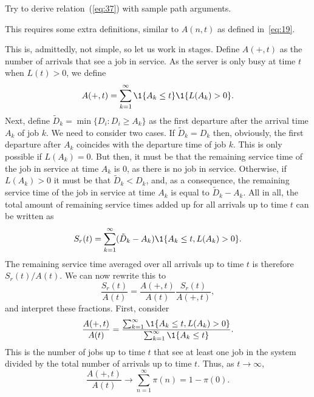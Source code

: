 \begin{exercise}
  Try to derive relation~(\ref{eq:37}) with sample path
  arguments. 
  \begin{hint}
This requires some extra definitions, similar to
  $A(n,t)$ as defined in~\eqref{eq:19}.
  \end{hint}
  \begin{solution}
    This is, admittedly, not simple, so let us work in stages. Define
    $A(+,t)$ as the number of arrivals that see a job in service. As
    the server is only busy at time $t$ when $L(t)>0$, we define
    \begin{equation*}
      A(+,t) = \sum_{k=1}^\infty \1{A_k\leq t}\1{L(A_k) > 0}.
    \end{equation*}
    Next, define $\tilde D_k = \min\{D_i: D_i \geq A_k\}$ as the first
    departure after the arrival time $A_k$ of job $k$. We need to
    consider two cases. If $\tilde D_k = D_k$ then, obviously, the
    first departure after $A_k$ coincides with the departure time of
    job $k$. This is only possible if $L(A_k) = 0$. But then, it must
    be that the remaining service time of the job in service at time
    $A_k$ is 0, as there is no job in service. Otherwise, if
    $L(A_k)>0$ it must be that $\tilde D_k < D_k$, and, as a
    consequence, the remaining service time of the job in service at
    time $A_k$ is equal to $\tilde D_k - A_k$. All in all, the total
    amount of remaining service times added up for all arrivals up to
    time $t$ can be written as
    \begin{equation*}
      S_r(t) = \sum_{k=1}^\infty (\tilde D_k - A_k) \1{A_k \leq t, L(A_k) > 0}.
    \end{equation*}
    The remaining service time averaged over all arrivals up to
    time $t$ is therefore $S_r(t)/A(t)$. We can now rewrite this to
\begin{equation*}
  \frac{S_r(t)}{A(t)} = 
  \frac{A(+,t)}{A(t)} \frac{S_r(t)}{A(+,t)}, 
\end{equation*}
and interpret these fractions.  First, consider
\begin{equation*}
  \frac{A(+,t)}{A(t)} = 
\frac{\sum_{k=1}^\infty \1{A_k\leq t, L(A_k) > 0}}{\sum_{k=1}^\infty \1{A_k\leq t}}.
\end{equation*}
This is the number of jobs up to time $t$ that see at least one job in
the system divided by the total number of arrivals up to time $t$. Thus, as $t\to\infty$, 
\begin{equation*}
  \frac{A(+,t)}{A(t)} \to \sum_{n=1}^\infty \pi(n) = 1-\pi(0).

\end{equation*}
\end{solution}
\end{exercise}
